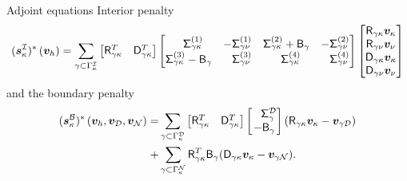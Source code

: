 \documentclass{beamer}
\begin{document}
\begin{frame}{Adjoint equations}
    Interior penalty
    \footnotesize
    \begin{equation*} \label{ad_interface_sat}
    (\bm{s}_{\kappa}^{\fnc{I}})^{*}\left(\bm{v}_{h}\right)
    = \sum_{\gamma \subset \Gamma_\kappa^\fnc{I}}
    \begin{bmatrix} \Rgk^T & \Dgk^T \end{bmatrix}
    \setlength{\arraycolsep}{7pt}
    \setlength{\arraycolsep}{5pt}
    \begin{bmatrix}
    \phnt{-}\Siggk{1}       & -\Siggn{1}      & \Siggk{2} + \Bg & -\Siggn{2} \\
    \Siggk{3} - \Bg & \phnt{-}\Siggn{3}       & \phnt{-}\Siggk{4}       & \phnt{-}\Siggn{4}
    \end{bmatrix}
    \begin{bmatrix} \Rgk \Vkp \\ \Rgn \Vnu \\ \Dgk \Vkp \\ \Dgn \Vnu \end{bmatrix} 
    \end{equation*}
    \normalsize
    and the boundary penalty
    \footnotesize
    \begin{equation*}
    \begin{aligned}
    (\bm{s}_{\kappa}^{\fnc{B}})^{*}\left(\bm{v}_{h}, \bm{v}_\fnc{D}, \bm{v}_\fnc{N}\right)
    =& \sum_{\gamma \subset \Gamma_\kappa^{\fnc{D}}}
    \begin{bmatrix} \Rgk^T & \Dgk^T \end{bmatrix}
    \begin{bmatrix} \phnt{-}\Sig_{\gamma}^{\fnc{D}} \\ -\Bg \end{bmatrix}
    (\Rgk \Vkp - \bm{v}_{\gamma\fnc{D}}) \\
    +& \sum_{\gamma \subset \Gamma_\kappa^{\fnc{N}}} \Rgk^{T}\B_{\gamma} (\Dgk \Vkp - \bm{v}_{\gamma\fnc{N}}).
    \end{aligned}
    \end{equation*} 
\end{frame}
\end{document}
